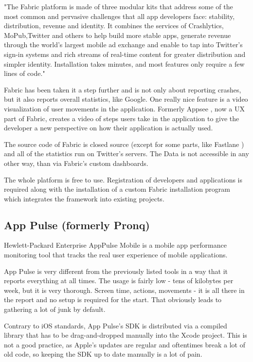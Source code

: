 \bigbreak

"The Fabric platform is made of three modular kits that address some of the most common and pervasive challenges that all app developers face: stability, distribution, revenue and identity. It combines the services of Crashlytics, MoPub,Twitter and others to help build more stable apps, generate revenue through the world’s largest mobile ad exchange and enable to tap into Twitter’s sign-in systems and rich streams of real-time content for greater distribution and simpler identity. Installation takes minutes, and most features only require a few lines of code." \cite{fabric}

\bigbreak

Fabric has been taken it a step further and is not only about reporting crashes, but it also reports overall statistics, like Google. One really nice feature is a video visualization of user movements in the application. Formerly Appsee \cite{appsee}, now a UX part of Fabric, creates a video of steps users take in the application to give the developer a new perspective on how their application is actually used.

The source code of Fabric is closed source (except for some parts, like Fastlane \cite{fastlane}) and all of the statistics run on Twitter's servers. The Data is not accessible in any other way, than via Fabric's custom dashboards. 

The whole platform is free to use. Registration of developers and applications is required along with the installation of a custom Fabric installation program which integrates the framework into existing projects.

\subsection{App Pulse (formerly Pronq)}

Hewlett-Packard Enterprise AppPulse Mobile is a mobile app performance monitoring tool that tracks the real user experience of mobile applications.

App Pulse is very different from the previously listed tools in a way that it reports everything at all times. The usage is fairly low - tens of kilobytes per week, but it is very thorough. Screen time, actions, movements - it is all there in the report and no setup is required for the start. That obviously leads to gathering a lot of junk by default.

Contrary to iOS standards, App Pulse's SDK is distributed via a compiled library that has to be drag-and-dropped manually into the Xcode project. This is not a good practice, as Apple's updates are regular and oftentimes break a lot of old code, so keeping the SDK up to date manually is a lot of pain.

